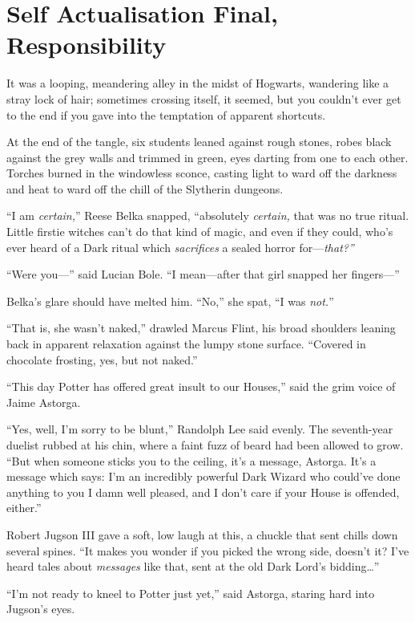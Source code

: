 \chapter{Self Actualisation Final, Responsibility}

It was a looping, meandering alley in the midst of Hogwarts, wandering
like a stray lock of hair; sometimes crossing itself, it seemed, but you
couldn't ever get to the end if you gave into the temptation of apparent
shortcuts.

At the end of the tangle, six students leaned against rough stones,
robes black against the grey walls and trimmed in green, eyes darting
from one to each other. Torches burned in the windowless sconce, casting
light to ward off the darkness and heat to ward off the chill of the
Slytherin dungeons.

``I am \emph{certain,}'' Reese Belka snapped, ``absolutely
\emph{certain,} that was no true ritual. Little firstie witches can't do
that kind of magic, and even if they could, who's ever heard of a Dark
ritual which \emph{sacrifices} a sealed horror for---\emph{that?''}

``Were you---'' said Lucian Bole. ``I mean---after that girl snapped her
fingers---''

Belka's glare should have melted him. ``No,'' she spat, ``I was
\emph{not.}''

``That is, she wasn't naked,'' drawled Marcus Flint, his broad shoulders
leaning back in apparent relaxation against the lumpy stone surface.
``Covered in chocolate frosting, yes, but not naked.''

``This day Potter has offered great insult to our Houses,'' said the
grim voice of Jaime Astorga.

``Yes, well, I'm sorry to be blunt,'' Randolph Lee said evenly. The
seventh-year duelist rubbed at his chin, where a faint fuzz of beard had
been allowed to grow. ``But when someone sticks you to the ceiling, it's
a message, Astorga. It's a message which says: I'm an incredibly
powerful Dark Wizard who could've done anything to you I damn well
pleased, and I don't care if your House is offended, either.''

Robert Jugson III gave a soft, low laugh at this, a chuckle that sent
chills down several spines. ``It makes you wonder if you picked the
wrong side, doesn't it? I've heard tales about \emph{messages} like
that, sent at the old Dark Lord's bidding\ldots{}''

``I'm not ready to kneel to Potter just yet,'' said Astorga, staring
hard into Jugson's eyes.

